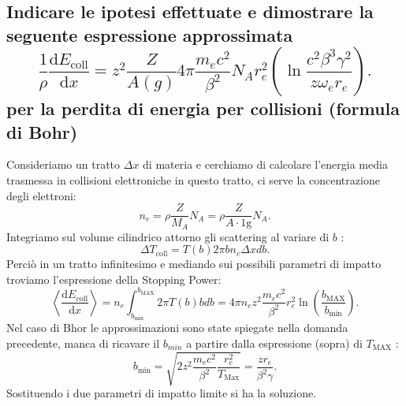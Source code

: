 \subsection[\hspace{1mm} Dimostrare la formula di perdita di energia per collisioni secondo le approssimazioni di Bhor]{Indicare le ipotesi effettuate e dimostrare la seguente espressione approssimata
\[
	\frac{1}{\rho}\frac{\mbox{d} E_{\text{coll}}}{\mbox{d} x} = z^2 \frac{Z}{A\left( g \right) } 4 \pi \frac{m_e c^2}{\beta^2}N_A r_e^2\left( \ln \frac{c^2\beta^3\gamma^2}{z \omega_e r_e} \right) 
.\] 
 per la perdita di energia per collisioni (formula di Bohr)
}
\label{sec:4.b.15}
Consideriamo un tratto $\Delta x$ di materia e cerchiamo di calcolare l'energia media trasmessa in collisioni elettroniche in questo tratto, ci serve la concentrazione degli elettroni:
\[
	n_e =\rho \frac{Z}{M_A}N_A = \rho \frac{Z}{A\cdot 1\text{g}}N_A
.\] 
Integriamo sul volume cilindrico attorno gli scattering al variare di $b$ :
\[
	\Delta T_{\text{coll}} =T\left( b \right) 2 \pi b n_e \Delta x db
.\] 
Perciò in un tratto infinitesimo e mediando sui possibili parametri di impatto troviamo l'espressione della Stopping Power:
\[
	\left< \frac{\mbox{d} E_{\text{coll}}}{\mbox{d} x} \right> = n_e \int_{b_{\text{min}}}^{b_{\text{MAX}}} 2 \pi T\left( b \right) b db = 
	4 \pi n_e z^2 \frac{m_e c^2}{\beta^2} r_e^2 \ln\left( \frac{b_{\text{MAX}}}{b_{\text{min}}} \right) 
.\] 
Nel caso di Bhor le approssimazioni sono state spiegate nella domanda precedente, manca di ricavare il $b_{min}$ a partire dalla espressione (sopra) di $T_{\text{MAX}}$ :
\[
	b_{\text{min}}= \sqrt{2z^2 \frac{m_e c^2}{\beta^2} \frac{r_e^2}{T_{\text{Max}}} } =
	\frac{zr_e}{\beta^2 \gamma}
.\] 	
Sostituendo i due parametri di impatto limite si ha la soluzione.

